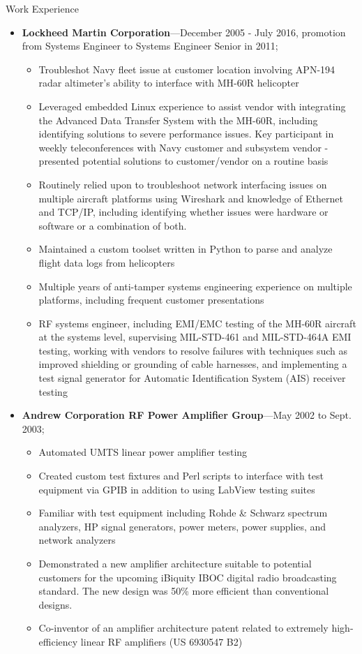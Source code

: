 \documentclass[10pt,oneside]{article}
\newenvironment{ressection}[1]{
	\vspace{4pt}
	{\Large#1}
	\begin{itemize}
	\vspace{3pt}
}{
	\end{itemize}
}
\newcommand{\ressubitem}[1]{
	\vspace{-1pt}
	\item \begin{flushleft} #1 \end{flushleft}
}
\newcommand{\resbigitem}[3]{
	\vspace{-5pt}
	\item
	\textbf{#1}---#2; \quad \textit{#3}
}
\newenvironment{ressubsec}[3]{
	\resbigitem{#1}{#2}{#3}
	\vspace{-2pt}
	\begin{itemize}
}{
	\end{itemize}
}
\newenvironment{ressection}[1]{
	\vspace{4pt}
	{\fontfamily{phv}\selectfont\Large#1}
	\begin{itemize}[leftmargin=12pt]
	\vspace{3pt}
}{
	\end{itemize}
}
\newcommand{\ressubitem}[1]{
	\vspace{-1pt}
	\item \begin{flushleft} #1 \end{flushleft}
}
\newcommand{\resbigitem}[2]{
	\vspace{-5pt}
	\item
	\textbf{#1}---\textit{#2}
}
\newenvironment{ressubsec}[2]{
	\resbigitem{#1}{#2}
	\vspace{-2pt}
	\begin{itemize}[leftmargin=12pt]
	}{
	\end{itemize}
}
\begin{document}
\begin{ressection}{Work Experience}
	\begin{ressubsec}{Lockheed Martin Corporation}{December 2005 - July 2016, promotion from Systems Engineer to Systems Engineer Senior in 2011}
        \ressubitem{Display test and measurement subject matter expert - sunlight readability evaluation, night vision compatibility evaluation, contrast and luminance measurement, chromaticity measurement in support of multiple platforms}
	  	\ressubitem{Troubleshot Navy fleet issue at customer location involving APN-194 radar altimeter's ability to interface with MH-60R helicopter}
        \ressubitem{Leveraged embedded Linux experience to assist vendor with integrating the Advanced Data Transfer System with the MH-60R, including identifying solutions to severe performance issues.  Key participant in weekly teleconferences with Navy customer and subsystem vendor - presented potential solutions to customer/vendor on a routine basis}
        \ressubitem{Routinely relied upon to troubleshoot network interfacing issues on multiple aircraft platforms using Wireshark and knowledge of Ethernet and TCP/IP, including identifying whether issues were hardware or software or a combination of both.}
        \ressubitem{Maintained a custom toolset written in Python to parse and analyze flight data logs from helicopters}
        \ressubitem{Multiple years of anti-tamper systems engineering experience on multiple platforms, including frequent customer presentations}

        \ressubitem{RF systems engineer, including EMI/EMC testing of the MH-60R aircraft at the systems level, supervising MIL-STD-461 and MIL-STD-464A EMI testing, working with vendors to resolve failures with techniques such as improved shielding or grounding of cable harnesses, and implementing a test signal generator for Automatic Identification System (AIS) receiver testing}
	\end{ressubsec}

	\begin{ressubsec}{Andrew Corporation RF Power Amplifier Group}{May 2002 to Sept. 2003}
		\ressubitem{Developed new amplifier architectures}
	    \ressubitem{Automated UMTS linear power amplifier testing}
		\ressubitem{Created custom test fixtures and Perl scripts to interface with test equipment via GPIB in addition to using LabView testing suites}
		\ressubitem{Familiar with test equipment including Rohde \& Schwarz spectrum analyzers, HP signal generators, power meters, power supplies, and network analyzers}
		\ressubitem{Demonstrated a new amplifier architecture suitable to potential customers for the upcoming iBiquity IBOC digital radio broadcasting standard. The new design was 50\% more efficient than conventional designs.}
		\ressubitem{Co-inventor of an amplifier architecture patent related to extremely high-efficiency linear RF amplifiers (US 6930547 B2)}
	\end{ressubsec}


\end{ressection}
\end{document}
